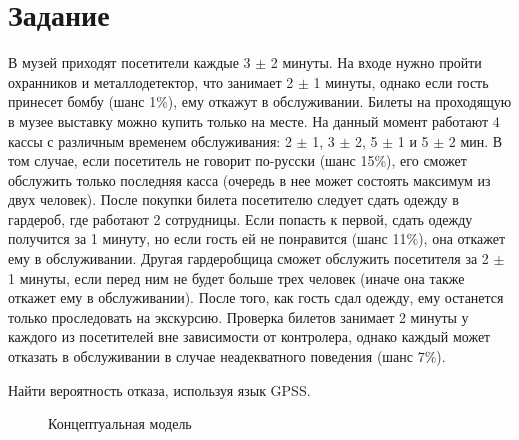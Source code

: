 \section*{Задание}

\Large В музей приходят посетители каждые 3 $\pm$ 2 минуты. На входе нужно пройти охранников и металлодетектор, что занимает 2 $\pm$ 1 минуты, однако если гость принесет бомбу (шанс 1\%), ему откажут в обслуживании. Билеты на проходящую в музее выставку можно купить только на месте. На данный момент работают 4 кассы с различным временем обслуживания: 2 $\pm$ 1, 3 $\pm$ 2, 5 $\pm$ 1 и 5 $\pm$ 2 мин. В том случае, если посетитель не говорит по-русски (шанс 15\%), его сможет обслужить только последняя касса (очередь в нее может состоять максимум из двух человек). После покупки билета посетителю следует сдать одежду в гардероб, где работают 2 сотрудницы. Если попасть к первой, сдать одежду получится за 1 минуту, но если гость ей не понравится (шанс 11\%), она откажет ему в обслуживании. Другая гардеробщица сможет обслужить посетителя за 2 $\pm$ 1 минуты, если перед ним не будет больше трех человек (иначе она также откажет ему в обслуживании). После того, как гость сдал одежду, ему останется только проследовать на экскурсию. Проверка билетов занимает 2 минуты у каждого из посетителей вне зависимости от контролера, однако каждый может отказать в обслуживании в случае неадекватного поведения (шанс 7\%).

Найти вероятность отказа, используя язык GPSS.

\begin{figure}[h]
	\caption{Концептуальная модель}
	\label{ris:image1}
\end{figure}

\newpage
